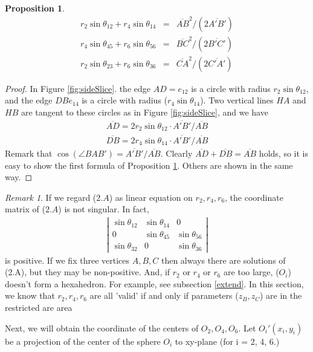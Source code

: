 \documentclass[dvipdfmx]{interact}
\theoremstyle{plain}%
\newtheorem{proposition}[theorem]{Proposition}
\theoremstyle{definition}
\theoremstyle{remark}
\newtheorem{remark}{Remark}
\theoremstyle{problemstyle}
\begin{document}
\begin{proposition}\label{angles}
 \begin{eqnarray}
 r_2\sin\theta_{12} + r_4\sin\theta_{14} &=& \overline{AB}^2 / (2\overline{A'B'})\\
 r_4\sin\theta_{45} + r_6\sin\theta_{56} &=& \overline{BC}^2 / (2\overline{B'C'})\\
 r_2\sin\theta_{23} + r_6\sin\theta_{36} &=& \overline{CA}^2 / (2\overline{C'A'})
 \end{eqnarray}
\end{proposition}

\begin{proof}
 In Figure \ref{fig:sideSlice}. the edge $AD = e_{12}$ is a circle with radius
 $r_2\sin\theta_{12}$, and the edge $DB e_{14}$ is a circle with radius
 ($r_4\sin\theta_{14}$).
Two vertical lines $HA$ and $HB$ are tangent to these circles as in
 Figure \ref{fig:sideSlice},
 and we have 
 \begin{eqnarray*}
  \overline{AD} = 2 r_2 \sin\theta_{12} \cdot \overline{A'B'}/\overline{AB}\\
  \overline{DB} = 2 r_4 \sin\theta_{14} \cdot \overline{A'B'}/\overline{AB}
 \end{eqnarray*}
 Remark that $\cos(\angle BAB') =\overline{A'B'}/\overline{AB}.$ Clearly
 $\overline{AD} + \overline{DB} = \overline{AB}$ holds, so it is easy to
 show the first formula of Proposition \ref{angles}. Others are shown in the same
 way.

\end{proof}

\begin{remark}
 If we regard ($2.A$) as linear equation on $r_2, r_4, r_6$, the
 coordinate matrix of ($2.A$) is not singular. In fact,
 \begin{eqnarray*}
  \left| 
   \begin{array}{ccc}
    \sin\theta_{12} & \sin\theta_{14} & 0\\
    0               & \sin\theta_{45} & \sin\theta_{56}\\
    \sin\theta_{32} & 0               & \sin\theta_{36}
   \end{array}
  \right|
 \end{eqnarray*}
 is positive.
 If we fix three vertices $A, B, C$ then always there are solutions of
 (2.A), but they may be non-positive. And, if $r_2$ or $r_4$ or $r_6$
 are too large, ($O_i$) doesn't form a hexahedron. For example, see
 subsection \ref{extend}. In this section, we know that $r_2, r_4, r_6$ are all
 'valid' if and only if parameters ($z_B, z_C$) are in the restricted are
 area

Next, we will obtain the coordinate of the centers of $O_2, O_4, O_6$.
Let $O_i'(x_i, y_i)$ be a projection of the center of the sphere $O_i$
 to xy-plane (for i = 2, 4, 6.)
\end{remark}
\end{document}
